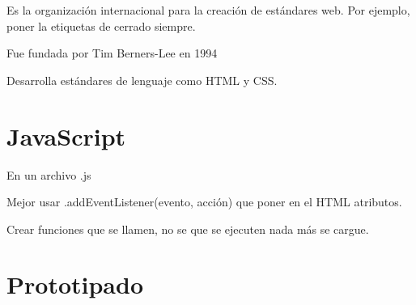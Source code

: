 \documentclass[12pt, twoside, openright]{report} %
\begin{document}
    Es la organización internacional para la creación de estándares web.
    Por ejemplo, poner la etiquetas de cerrado siempre.

    Fue fundada por Tim Berners-Lee en 1994

    Desarrolla estándares de lenguaje como HTML y CSS.

\chapter{JavaScript}

  En un archivo .js

  Mejor usar .addEventListener(evento, acción) que poner en el HTML
  atributos.

  Crear funciones que se llamen, no se que se ejecuten nada más se
  cargue.

\chapter{Prototipado}





\end{document}
